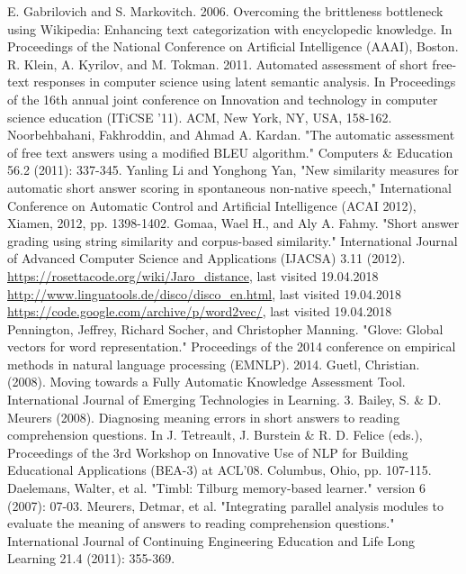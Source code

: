\documentclass[rnd]{mas_report}
\begin{document}
\begin{thebibliography}{3}
 E. Gabrilovich and S. Markovitch. 2006. Overcoming the brittleness bottleneck using Wikipedia: Enhancing text categorization with encyclopedic knowledge. In Proceedings of the National Conference on Artificial Intelligence (AAAI), Boston.
 R. Klein, A. Kyrilov, and M. Tokman. 2011. Automated assessment of short free-text responses in computer science using latent semantic analysis. In Proceedings of the 16th annual joint conference on Innovation and technology in computer science education (ITiCSE '11). ACM, New York, NY, USA, 158-162. 
 Noorbehbahani, Fakhroddin, and Ahmad A. Kardan. "The automatic assessment of free text answers using a modified BLEU algorithm." Computers \& Education 56.2 (2011): 337-345.
 Yanling Li and Yonghong Yan, "New similarity measures for automatic short answer scoring in spontaneous non-native speech," International Conference on Automatic Control and Artificial Intelligence (ACAI 2012), Xiamen, 2012, pp. 1398-1402.
 Gomaa, Wael H., and Aly A. Fahmy. "Short answer grading using string similarity and corpus-based similarity." International Journal of Advanced Computer Science and Applications (IJACSA) 3.11 (2012).
 \url{https://rosettacode.org/wiki/Jaro_distance}, last visited 19.04.2018
 \url{http://www.linguatools.de/disco/disco_en.html}, last visited 19.04.2018
 \url{https://code.google.com/archive/p/word2vec/}, last visited 19.04.2018
 Pennington, Jeffrey, Richard Socher, and Christopher Manning. "Glove: Global vectors for word representation." Proceedings of the 2014 conference on empirical methods in natural language processing (EMNLP). 2014.
 Guetl, Christian. (2008). Moving towards a Fully Automatic Knowledge Assessment Tool. International Journal of Emerging Technologies in Learning. 3. 
 Bailey, S. \& D. Meurers (2008). Diagnosing meaning errors in short answers to reading comprehension questions. In J. Tetreault, J. Burstein \& R. D. Felice (eds.), Proceedings of the 3rd Workshop on Innovative Use of NLP for Building Educational Applications (BEA-3) at ACL'08. Columbus, Ohio, pp. 107-115.
 Daelemans, Walter, et al. "Timbl: Tilburg memory-based learner." version 6 (2007): 07-03.
 Meurers, Detmar, et al. "Integrating parallel analysis modules to evaluate the meaning of answers to reading comprehension questions." International Journal of Continuing Engineering Education and Life Long Learning 21.4 (2011): 355-369.

\end{thebibliography}
\end{document}
